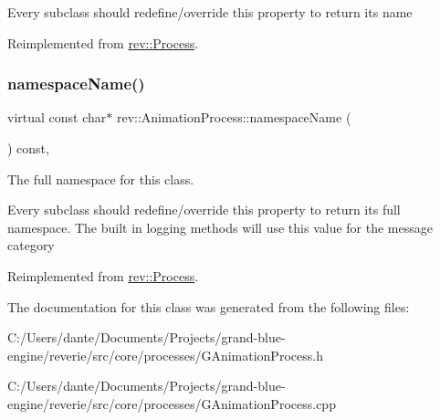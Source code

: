 Every subclass should redefine/override this property to return its name 

Reimplemented from \mbox{\hyperlink{classrev_1_1_process_adc27ddf4c0f44dab54a5f797c7135c44}{rev\+::\+Process}}.

\mbox{\label{classrev_1_1_animation_process_acb6fc0ee2382f8e5b09fd2d3f4847b27}} 
\subsubsection{\texorpdfstring{namespaceName()}{namespaceName()}}
{\footnotesize\ttfamily virtual const char$\ast$ rev\+::\+Animation\+Process\+::namespace\+Name (\begin{DoxyParamCaption}{ }\end{DoxyParamCaption}) const\hspace{0.3cm}{\ttfamily [inline]}, {\ttfamily [virtual]}}



The full namespace for this class. 

Every subclass should redefine/override this property to return its full namespace. The built in logging methods will use this value for the message category 

Reimplemented from \mbox{\hyperlink{classrev_1_1_process_a7f5a6ab8af65aec3132f6a072b9fcb87}{rev\+::\+Process}}.



The documentation for this class was generated from the following files\+:\begin{DoxyCompactItemize}
\item 
C\+:/\+Users/dante/\+Documents/\+Projects/grand-\/blue-\/engine/reverie/src/core/processes/G\+Animation\+Process.\+h\item 
C\+:/\+Users/dante/\+Documents/\+Projects/grand-\/blue-\/engine/reverie/src/core/processes/G\+Animation\+Process.\+cpp\end{DoxyCompactItemize}
